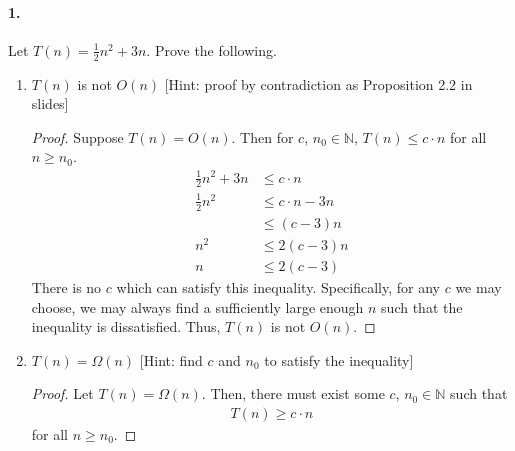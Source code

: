\documentclass{article}
\begin{document}
\paragraph{1.}Let $T(n) = \frac{1}{2}n^2 + 3n$. Prove the following.
\begin{enumerate}[label=(\alph*).]
    \item $T(n)$ is not $O(n)$ [Hint: proof by contradiction as Proposition 2.2 in slides]
        \begin{proof} 
            Suppose $T(n) = O(n)$. Then for $c$, $n_0 \in \mathbb{N}$, 
            $T(n) \le c\cdot n$ for all $n \ge n_0$.
            \begin{align*}
                \frac{1}{2}n^2+3n &\le c\cdot n\\
                \frac{1}{2}n^2 &\le c\cdot n - 3n\\
                               &\le (c-3)n \\ 
                           n^2 &\le 2(c-3)n \\
                             n &\le 2(c-3)
            \end{align*}
            There is no $c$ which can satisfy this inequality. Specifically,
            for any $c$ we may choose, we may always find a sufficiently large enough
            $n$ such that the inequality is dissatisfied. Thus, $T(n)$ is not $O(n)$.
        \end{proof}
    \item $T(n) = \Omega(n)$ [Hint: find $c$ and $n_0$ to satisfy the inequality]
        \begin{proof}
            Let $T(n)=\Omega(n)$. Then, there must exist some $c$, $n_0 \in \mathbb{N}$ such that
            \begin{align*}
                T(n) \ge c \cdot n
            \end{align*}
            for all $n \ge n_0$.
            

\end{proof}
\end{enumerate}
\end{document}
